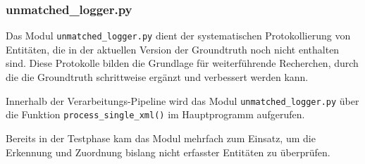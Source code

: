 \documentclass[12pt, a4paper, ngerman, bidi=default]{article}
\begin{document}
\begin{minipage}[t]{0.52\textwidth}
  \justifying%

  \subsubsection{unmatched\_logger.py}\label{subsec:unmatched_logger}

Das Modul \texttt{unmatched\_logger.py} dient der systematischen Protokollierung von Entitäten, 
die in der aktuellen Version der Groundtruth noch nicht enthalten sind. 
Diese Protokolle bilden die Grundlage für weiterführende Recherchen, 
durch die die Groundtruth schrittweise ergänzt und verbessert werden kann.

\noindent Innerhalb der Verarbeitungs-Pipeline wird das Modul \texttt{unmatched\_logger.py} über die Funktion \texttt{process\_single\_xml()} im Hauptprogramm aufgerufen. 

\noindent Bereits in der Testphase kam das Modul mehrfach zum Einsatz, um die Erkennung und Zuordnung bislang nicht erfasster Entitäten zu überprüfen.
\end{minipage}%
\hfill
\end{document}
